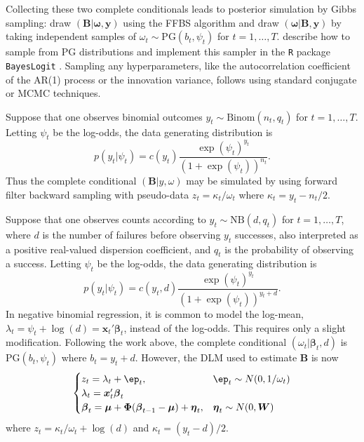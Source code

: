 \documentclass[12pt]{article}
\newcommand{\PG}{\text{PG}}
\newcommand{\NB}{\text{NB}}
\newcommand{\bbeta}{\boldsymbol{\beta}}
\newcommand{\oomega}{\boldsymbol{\omega}}
\newcommand{\yy}{\boldsymbol{y}}
\newcommand{\vx}{\boldsymbol{x}}
\newcommand{\betap}{{\boldsymbol{B}}}
\newcommand{\bW}{\boldsymbol{W}}
\newcommand{\bPhi}{\boldsymbol{\Phi}}
\newcommand{\bmu}{\boldsymbol{\mu}}
\newcommand{\veta}{\boldsymbol{\eta}}
\begin{document}
Collecting these two complete conditionals leads to posterior simulation by
Gibbs sampling: draw $(\betap|\oomega, \yy)$ using the FFBS algorithm and draw
$(\oomega | \betap, \yy)$ by taking independent samples of $\omega_t \sim
\PG(b_t, \psi_t)$ for $t=1, \ldots, T$.  \cite{polson-etal-2013} describe how to
sample from $\PG$ distributions and implement this sampler in the \texttt{R}
package \texttt{BayesLogit} \citep{bayeslogit-2013}.  Sampling any
hyperparameters, like the autocorrelation coefficient of the AR(1) process or
the innovation variance, follows using standard conjugate or MCMC techniques.

\begin{example}
  Suppose that one observes binomial outcomes $y_t \sim \text{Binom}(n_t, q_t)$
  for $t=1, \ldots, T$.  Letting $\psi_t$ be the log-odds, the data generating
  distribution is
  \[
  p(y_t | \psi_t) = c(y_t) \frac{\exp(\psi_t)^{y_t}}{(1+\exp({\psi_t}))^{n_t}}.
  \]
  Thus the complete conditional $(\betap | y, \omega)$ may be simulated by using
  forward filter backward sampling with pseudo-data $z_t = \kappa_t / \omega_t$
  where $\kappa_t = y_t - n_t / 2$.
\end{example}


\begin{example}
  Suppose that one observes counts according to $y_t \sim \NB(d, q_t)$ for
  $t=1, \ldots, T$, where $d$ is the number of failures before observing $y_t$
  successes, also interpreted as a positive real-valued dispersion coefficient,
  and $q_t$ is the probability of observing a success.  Letting $\psi_t$ be the
  log-odds, the data generating distribution is
  \[
  p(y_t | \psi_t) = c(y_t, d) \frac{\exp({\psi_t})^{y_t}}{(1+\exp({\psi_t}))^{y_t+d}}.
  \]
  In negative binomial regression, it is common to model the log-mean, $\lambda_t
  = \psi_t + \log(d) = \vx_t' \bbeta_t$, instead of the log-odds.  This requires only
  a slight modification.  Following the work above, the complete conditional
  $(\omega_t | \bbeta_t, d)$ is $\PG(b_t, \psi_t)$ where $b_t = y_t + d$.  However,
  the DLM used to estimate $\betap$ is now
  \[
  \begin{cases}
    z_t = \lambda_t + \ep_t, & \ep_t \sim N(0, 1/\omega_t) \\
    \lambda_t = \vx_t' \bbeta_t \\
    \bbeta_t = \bmu + \bPhi (\bbeta_{t-1} - \bmu) + \veta_t, & \veta_t \sim N(0, \bW)
  \end{cases}
  \]
  where $z_t = \kappa_t / \omega_t + \log(d)$ and $\kappa_t = (y_t - d) / 2$.
\end{example}
\end{document}
